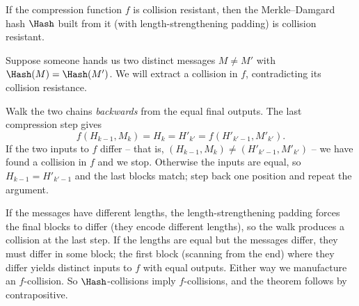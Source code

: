 \begin{center}
\end{center}

\begin{theorem}
\label{ch14:md-thm}
If the compression function $f$ is collision resistant, then the Merkle--Damgard hash $\Hash$ built from it (with length-strengthening padding) is collision resistant.
\end{theorem}

\begin{whybox}
Suppose someone hands us two distinct messages $M \ne M'$ with $\Hash(M) = \Hash(M')$. We will extract a collision in $f$, contradicting its collision resistance.

Walk the two chains \emph{backwards} from the equal final outputs. The last compression step gives
\[
  f(H_{k-1}, M_k) = H_k = H'_{k'} = f(H'_{k'-1}, M'_{k'}).
\]
If the two inputs to $f$ differ -- that is, $(H_{k-1}, M_k) \ne (H'_{k'-1}, M'_{k'})$ -- we have found a collision in $f$ and we stop. Otherwise the inputs are equal, so $H_{k-1} = H'_{k'-1}$ and the last blocks match; step back one position and repeat the argument.

If the messages have different lengths, the length-strengthening padding forces the final blocks to differ (they encode different lengths), so the walk produces a collision at the last step. If the lengths are equal but the messages differ, they must differ in some block; the first block (scanning from the end) where they differ yields distinct inputs to $f$ with equal outputs. Either way we manufacture an $f$-collision. So $\Hash$-collisions imply $f$-collisions, and the theorem follows by contrapositive.
\end{whybox}

